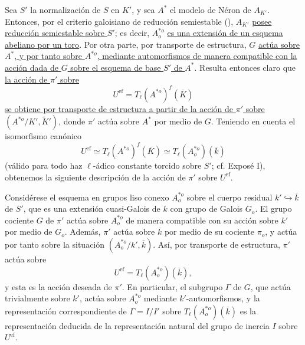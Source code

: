 Sea $S'$ la normalización de $S$ en $K'$, y sea $A^*$ el modelo de
Néron de $A_{K'}$. Entonces, por el criterio galoisiano de reducción
semiestable (), $A_{K'}$ \underline{posee reducción
semiestable sobre $S'$}; es decir, $A^{*o}_o$ \underline{es una
extensión de un esquema abeliano por un toro}. Por otra parte, por
transporte de estructura, $G$ \underline{actúa sobre $A^*$, y por tanto
sobre $A^{*o}$, mediante automorfismos de manera compatible con la
acción dada de $G$ sobre el esquema de base $S'$ de $A^*$}. Resulta
entonces claro que \underline{la acción de $\pi'$ sobre}
\[
 U^{\mathrm{ef}}=T_\ell(A^{*o})^f(\overline K)
\]
\underline{se obtiene por transporte de estructura a partir de la
acción de $\pi'$ sobre $(A^{*o}/K',\widetilde K')$}, donde $\pi'$ actúa
sobre $A^*$ por medio de $G$. Teniendo en cuenta el isomorfismo canónico
\begin{equation}\tag{4.2.6}
 U^{\mathrm{ef}}\simeq T_\ell(A^{*o})^f(\overline K)
 \simeq T_\ell(A^{*o}_o)(\overline k)
\end{equation}
(válido para todo haz $\ell$-ádico constante torcido sobre $S'$; cf.
Exposé I), obtenemos la siguiente descripción de
la acción de $\pi'$ sobre $U^{\mathrm{ef}}$.

Considérese el esquema en grupos liso conexo $A^{*o}_o$ sobre el cuerpo
residual $k'\hookrightarrow\overline k$ de $S'$, que es una extensión
cuasi-Galois de $k$ con grupo de Galois $G_o$. El grupo cociente $G$ de
$\pi'$ actúa sobre $A^{*o}_o$ de manera compatible con su acción sobre
$k'$ por medio de $G_o$. Además, $\pi'$ actúa sobre $\overline k$ por
medio de su cociente $\pi_o$, y actúa por tanto sobre la situación
$(A^{*o}_o/k',\overline k)$. Así, por transporte de estructura, $\pi'$
actúa sobre
\[
 U^{\mathrm{ef}}=T_\ell(A^{*o}_o)(\overline k),
\]
y esta es la acción deseada de $\pi'$. En particular, el subgrupo
$\Gamma$ de $G$, que actúa trivialmente sobre $k'$, actúa sobre
$A^{*o}_o$ mediante $k'$-automorfismos, y la representación
correspondiente de $\Gamma=I/I'$ sobre
$T_\ell(A^{*o}_o)(\overline k)$ es la representación deducida de la
representación natural del grupo de inercia $I$ sobre
$U^{\mathrm{ef}}$.

